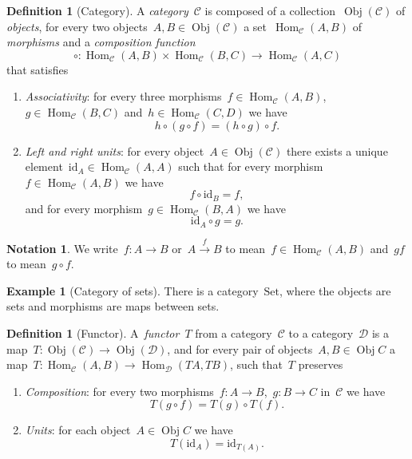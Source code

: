\documentclass[a4paper]{article}
\theoremstyle{plain}
\theoremstyle{definition}
\newtheorem{definition}[theorem]{Definition}
\newtheorem{notation}[theorem]{Notation}
\newtheorem{example}[theorem]{Example}
\DeclareMathOperator{\Obj}{Obj}
\DeclareMathOperator{\Hom}{Hom}
\newcommand{\id}{\mathrm{id}}
\newcommand{\Set}{\mathrm{Set}}
\newcommand{\cat}[1]{\mathcal{#1}}
\begin{document}
\begin{definition}[Category]
    \label{def:category}
    A \emph{category}~\(\cat{C}\) is composed of a collection~\(\Obj(\cat{C})\)
    of \emph{objects}, for every two objects~\(A,B\in\Obj(\cat{C})\) a
    set~\(\Hom_{\cat{C}}(A,B)\) of \emph{morphisms} and a \emph{composition
    function}
    \[
        \circ:\Hom_{\cat{C}}(A,B)\times\Hom_{\cat{C}}(B,C) \longrightarrow
        \Hom_{\cat{C}}(A,C)
    \]
    that satisfies
    \begin{enumerate}
        \item \emph{Associativity}: for every three
            morphisms~\(f\in\Hom_{\cat{C}}(A,B)\),~\(g\in\Hom_{\cat{C}}(B,C)\)
            and~\(h\in\Hom_{\cat{C}}(C,D)\)
            we have
            \[
                h \circ (g \circ f) = (h \circ g) \circ f.
            \]
        \item \emph{Left and right units}: for every
            object~\(A\in\Obj(\cat{C})\) there exists a unique
            element~\(\id_{A}\in\Hom_{\cat{C}}(A,A)\)
            such that for every morphism~\(f\in\Hom_{\cat{C}}(A,B)\) we have
            \[
                f \circ \id_{B} = f,
            \]
            and for every morphism~\(g\in\Hom_{\cat{C}}(B,A)\) we have
            \[
                \id_{A} \circ g = g.
            \]
    \end{enumerate}
\end{definition}

\begin{notation}
    We write~\(f:A\longrightarrow B\) or~\(A\overset{f}{\longrightarrow}B\) to
    mean~\(f\in\Hom_{\cat{C}}(A,B)\) and~\(gf\) to mean~\(g\circ f\).
\end{notation}

\begin{example}[Category of sets]
    \label{cat:set}
    There is a category~\(\Set\), where the objects are sets and morphisms are
    maps between sets.
\end{example}

\begin{definition}[Functor]
    \label{def:functor}
    A~\emph{functor}~\(T\) from a category~\(\cat{C}\) to a category~\(\cat{D}\)
    is a map~\(T:\Obj(\cat{C})\longrightarrow\Obj(\cat{D})\), and for every
    pair of objects~\(A,B\in\Obj{C}\) a
    map~\(T:\Hom_{\cat{C}}(A,B)\longrightarrow\Hom_{\cat{D}}(TA,TB)\),
    such that~\(T\) preserves
    \begin{enumerate}
        \item \emph{Composition}: for every two
            morphisms~\(f:A\longrightarrow B\),~\(g:B\longrightarrow C\)
            in~\(\cat{C}\) we have
            \[
                T(g \circ f) = T(g) \circ T(f).
            \]
        \item \emph{Units}: for each object~\(A\in\Obj{C}\) we have
            \[
                T(\id_{A}) = \id_{T(A)}.
            \]
    \end{enumerate}
\end{definition}
\end{document}
